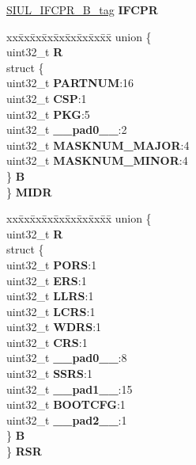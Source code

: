 \begin{DoxyCompactItemize}
\begin{tabbing}
\end{tabbing}\item 
\mbox{\label{structSIU__tag_ac62d878c18d9ec84107cbd4166407a8a}} 
\mbox{\hyperlink{unionSIUL__IFCPR__32B__tag}{S\+I\+U\+L\+\_\+\+I\+F\+C\+P\+R\+\_\+B\+\_\+tag}} {\bfseries I\+F\+C\+PR}
\item 
\mbox{\label{structSIU__tag_a7d57b1e849cd2831c824ba30d55eaeab}} 
\begin{tabbing}
xx\=xx\=xx\=xx\=xx\=xx\=xx\=xx\=xx\=\kill
union \{\\
\>uint32\_t {\bfseries R}\\
\>struct \{\\
\>\>uint32\_t {\bfseries PARTNUM}:16\\
\>\>uint32\_t {\bfseries CSP}:1\\
\>\>uint32\_t {\bfseries PKG}:5\\
\>\>uint32\_t {\bfseries \_\_pad0\_\_}:2\\
\>\>uint32\_t {\bfseries MASKNUM\_MAJOR}:4\\
\>\>uint32\_t {\bfseries MASKNUM\_MINOR}:4\\
\>\} {\bfseries B}\\
\} {\bfseries MIDR}\\

\end{tabbing}\item 
\mbox{\label{structSIU__tag_a18c43157a8a7b5966ecd9e77ce7e8cc1}} 
\begin{tabbing}
xx\=xx\=xx\=xx\=xx\=xx\=xx\=xx\=xx\=\kill
union \{\\
\>uint32\_t {\bfseries R}\\
\>struct \{\\
\>\>uint32\_t {\bfseries PORS}:1\\
\>\>uint32\_t {\bfseries ERS}:1\\
\>\>uint32\_t {\bfseries LLRS}:1\\
\>\>uint32\_t {\bfseries LCRS}:1\\
\>\>uint32\_t {\bfseries WDRS}:1\\
\>\>uint32\_t {\bfseries CRS}:1\\
\>\>uint32\_t {\bfseries \_\_pad0\_\_}:8\\
\>\>uint32\_t {\bfseries SSRS}:1\\
\>\>uint32\_t {\bfseries \_\_pad1\_\_}:15\\
\>\>uint32\_t {\bfseries BOOTCFG}:1\\
\>\>uint32\_t {\bfseries \_\_pad2\_\_}:1\\
\>\} {\bfseries B}\\
\} {\bfseries RSR}\\


\end{tabbing}
\end{DoxyCompactItemize}

